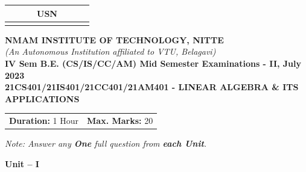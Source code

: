\documentclass[12pt,a4paper]{article}
\begin{document}
\begin{center}
\begin{tabular}{|c|c|c|c|c|c|c|c|c|c|}
\hline
\multicolumn{10}{|c|}{USN} \\
\hline
& & & & & & & & & \\
\hline
\end{tabular}

\vspace{0.5cm}

{\Large \textbf{NMAM INSTITUTE OF TECHNOLOGY, NITTE}}\\[0.2cm]
{\small \textit{(An Autonomous Institution affiliated to VTU, Belagavi)}}\\[0.3cm]
{\large \textbf{IV Sem B.E. (CS/IS/CC/AM) Mid Semester Examinations - II, July 2023}}\\[0.2cm]
{\large \textbf{21CS401/21IS401/21CC401/21AM401 - LINEAR ALGEBRA \& ITS APPLICATIONS}}\\[0.3cm]
\end{center}

\noindent
\begin{tabular}{p{8cm}r}
\textbf{Duration:} 1 Hour & \textbf{Max. Marks:} 20
\end{tabular}

\vspace{0.3cm}
\begin{center}
\textit{Note: Answer any \textbf{One} full question from \textbf{each Unit}.}
\end{center}

\vspace{0.3cm}

\begin{center}
{\large \textbf{Unit -- I}}
\end{center}
\end{document}
